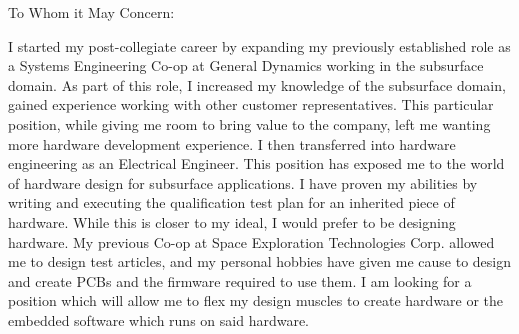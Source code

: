 \documentclass[line]{res}
\begin{document}
\setlength\columnsep{-30pt}
\address{56 South St.}
\address{Drury MA, 01343}
\website{}
 
\begin{resume}
 \setlength\multicolsep{2pt}


 
\vspace{1in}
To Whom it May Concern:
 
I started my post-collegiate career by expanding my previously established role
as a Systems Engineering Co-op at General Dynamics working in the subsurface
domain. As part of this role, I increased my knowledge of the subsurface domain,
gained experience working with other customer representatives. %
This particular position, while giving me
room to bring value to the company, left me wanting more hardware development
experience. I then transferred into hardware engineering as an Electrical
Engineer. This position has exposed me to the world of hardware design for
subsurface applications. I have proven my abilities by writing and executing
the qualification test plan for an inherited piece of hardware. While this is
closer to my ideal, I would prefer to be designing hardware. My previous Co-op at
Space Exploration Technologies Corp. allowed me to design test articles, 
and my personal hobbies have given
me cause to design and create PCBs and the firmware required to use them. 
I am looking for a position which will allow me to flex my design muscles 
to create hardware or the embedded software which runs on said hardware. 
 

\end{resume}
\end{document}
